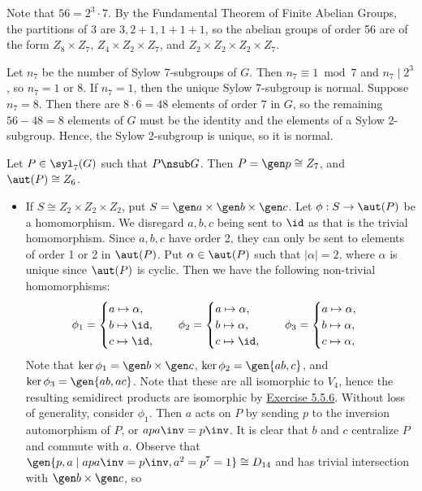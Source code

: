 \begin{solalph}
    \item Note that $56 = 2^3 \cdot 7$. By the Fundamental Theorem of Finite Abelian Groups, the partitions of 3 are $3, 2 + 1, 1 + 1 + 1$, so the abelian groups of order 56 are of the form $Z_8 \times Z_7$, $Z_4 \times Z_2 \times Z_7$, and $Z_2 \times Z_2 \times Z_2 \times Z_7$.
    \item Let $n_7$ be the number of Sylow 7-subgroups of $G$. Then $n_7 \equiv 1 \bmod 7$ and $n_7 \mid 2^3$, so $n_7 = 1$ or $8$. If $n_7 = 1$, then the unique Sylow 7-subgroup is normal. Suppose $n_7 = 8$. Then there are $8 \cdot 6 = 48$ elements of order 7 in $G$, so the remaining $56 - 48 = 8$ elements of $G$ must be the identity and the elements of a Sylow 2-subgroup. Hence, the Sylow 2-subgroup is unique, so it is normal.
    \item Let $P \in \syl_7(G)$ such that $P \nsub G$. Then $P = \gen p \cong Z_7$, and $\aut(P) \cong Z_6$.
    \begin{itemize}
        \item If $S \cong Z_2 \times Z_2 \times Z_2$, put $S = \gen a \times \gen b \times \gen c$. Let $\phi : S \to \aut(P)$ be a homomorphism. We disregard $a, b, c$ being sent to $\id$ as that is the trivial homomorphism. Since $a, b, c$ have order 2, they can only be sent to elements of order 1 or 2 in $\aut(P)$. Put $\alpha \in \aut(P)$ such that $|\alpha| = 2$, where $\alpha$ is unique since $\aut(P)$ is cyclic. Then we have the following non-trivial homomorphisms:
        \[\phi_1 = 
        \begin{cases}
            a \mapsto \alpha, \\
            b \mapsto \id, \\
            c \mapsto \id,
        \end{cases} \quad
        \phi_2 =
        \begin{cases}
            a \mapsto \alpha, \\
            b \mapsto \alpha, \\
            c \mapsto \id,
        \end{cases} \quad
        \phi_3 =
        \begin{cases}
            a \mapsto \alpha, \\
            b \mapsto \alpha, \\
            c \mapsto \alpha,
        \end{cases}\]
        Note that $\ker\phi_1 = \gen b \times \gen c$, $\ker\phi_2 = \gen{ab, c}$, and $\ker\phi_3 = \gen{ab, ac}$. Note that these are all isomorphic to $V_4$, hence the resulting semidirect products are isomorphic by \hyperref[ex5.5.6]{Exercise 5.5.6}. Without loss of generality, consider $\phi_1$. Then $a$ acts on $P$ by sending $p$ to the inversion automorphism of $P$, or $apa\inv = p\inv$. It is clear that $b$ and $c$ centralize $P$ and commute with $a$. Observe that $\gen{p, a \mid apa\inv = p\inv, a^2 = p^7 = 1} \cong D_{14}$ and has trivial intersection with $\gen b \times \gen c$, so

\end{itemize}
\end{solalph}
